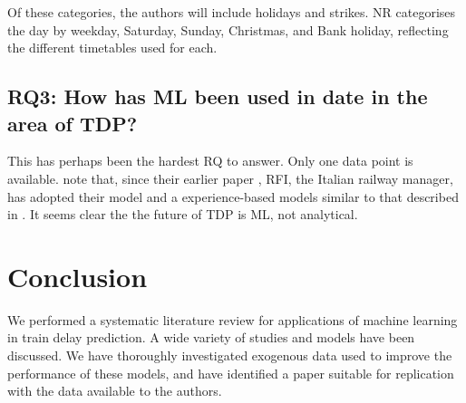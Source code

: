 \documentclass{article}
\begin{document}
Of these categories, the authors will include holidays and strikes. NR categorises the day by weekday, Saturday, Sunday, Christmas, and Bank holiday, reflecting the different timetables used for each.





\subsection{RQ3: How has ML been used in date in the area of TDP?}

This has perhaps been the hardest RQ to answer. Only one data point is available. \cite{oneto_et_al_2019} note that, since their earlier paper \cite{oneto_et_al_2016}, RFI, the Italian railway manager, has adopted their model and a experience-based models similar to that described in \cite{hansen_et_al_2019}. It seems clear the the future of TDP is ML, not analytical.


\section{Conclusion}

We performed a systematic literature review for applications of machine learning in train delay prediction. A wide variety of studies and models have been discussed. We have thoroughly investigated exogenous data used to improve the performance of these models, and have identified a paper suitable for replication with the data available to the authors.

\onecolumn

\printbibliography
 
\end{document}
